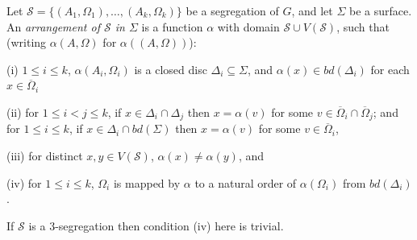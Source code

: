 Let $\mathscr{S} = \{(A_1, \Omega_1), \dots, (A_k, \Omega_k)\}$ be a segregation of $G$, and let $\Sigma$ be a surface. An \textit{arrangement of $\mathscr{S}$ in $\Sigma$} is a function $\alpha$ with domain $\mathscr{S} \cup V(\mathscr{S})$, such that (writing $\alpha(A, \Omega)$ for $\alpha((A, \Omega))$):

\hspace*{12pt}(i) $1 \le i \le k$, $\alpha(A_i, \Omega_i)$ is a closed disc $\Delta_i \subseteq \Sigma$, and $\alpha(x) \in bd(\Delta_i)$ for each $x \in \overline{\Omega}_i$

\hspace*{12pt}(ii) for $1 \le i < j \le k$, if $x \in \Delta_i \cap \Delta_j$ then $x = \alpha(v)$ for some $v \in \overline{\Omega}_i \cap \overline{\Omega}_j$; and for $1 \le i \le k$, if $x \in \Delta_i \cap bd(\Sigma)$ then $x = \alpha(v)$ for some $v \in \overline{\Omega}_i$,

\hspace*{12pt}(iii) for distinct $x, y \in V(\mathscr{S})$, $\alpha(x) \ne \alpha(y)$, and

\hspace*{12pt}(iv) for $1 \le i \le k$, $\Omega_i$ is mapped by $\alpha$ to a natural order of $\alpha(\Omega_i)$ from $bd(\Delta_i)$.

If $\mathscr{S}$ is a 3-segregation then condition (iv) here is trivial.
